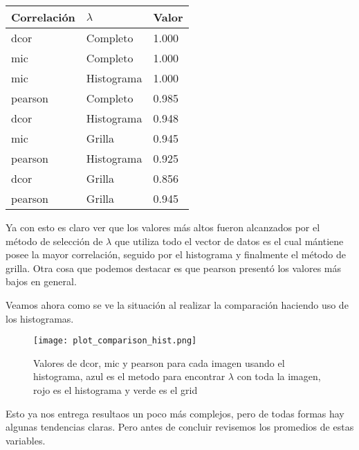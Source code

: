     \begin{table}[H]
        \centering
        \begin{tabular}{|l|l|l|}
            \hline
        Correlaci\'on    & $\lambda$ & Valor  \\    \hline
        dcor    & Completo    & 1.000  \\
        mic     & Completo    & 1.000  \\
        mic     & Histograma  & 1.000  \\
        pearson & Completo    & 0.985 \\
        dcor    & Histograma  & 0.948 \\
        mic     & Grilla      & 0.945  \\
        pearson & Histograma  & 0.925  \\
        dcor    & Grilla      & 0.856  \\
        pearson & Grilla      & 0.945  \\     \hline

        \end{tabular}
    \end{table}

    Ya con esto es claro ver que los valores m\'as altos fueron alcanzados por el m\'etodo de selecci\'on de  $\lambda$ que utiliza todo el vector de datos es el cual m\'antiene posee la mayor correlaci\'on, seguido por el histograma y finalmente el m\'etodo de grilla. Otra cosa que podemos destacar es que pearson present\'o los valores m\'as bajos en general.

    Veamos ahora como se ve la situaci\'on al realizar la comparaci\'on haciendo uso de los histogramas.

    \begin{figure}[H]
        \centering
        \texttt{[image: plot\_comparison\_hist.png]}
        \caption{Valores de dcor, mic y pearson para cada imagen usando el histograma, azul es el metodo para encontrar $\lambda$ con toda la imagen, rojo es el histograma y verde es el grid}
    \end{figure}

    Esto ya nos entrega resultaos un poco m\'as complejos, pero de todas formas hay algunas tendencias claras. Pero antes de concluir revisemos los promedios de estas variables.

